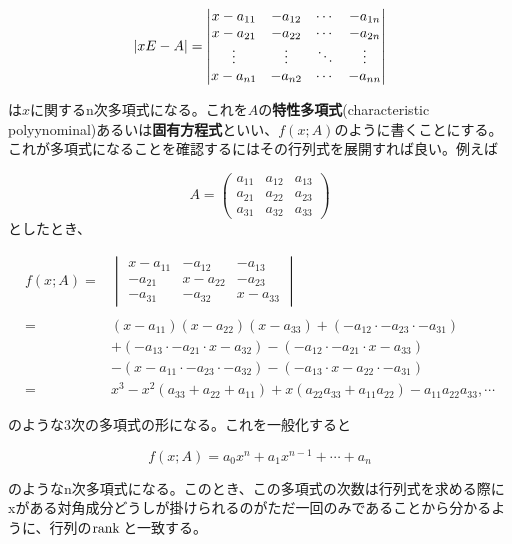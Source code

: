 \documentclass[dvipdfmx,autodetect-engine]{jsarticle}
\theoremstyle{definition}
\newcommand{\rank}[1]{{\rm rank}\,#1}
\DeclarePairedDelimiter{\abs}{\lvert}{\rvert}
\begin{document}
$$
\abs{xE - A} = \begin{vmatrix}
x - a_{11} & -a_{12} & \cdots & - a_{1n} \\
x - a_{21} & -a_{22} & \cdots & - a_{2n} \\
\vdots     & \vdots  & \ddots & \vdots \\
x - a_{n1} & -a_{n2} & \cdots & - a_{nn}
\end{vmatrix}
$$

は$x$に関するn次多項式になる。これを$A$の{\bf 特性多項式}(characteristic polyynominal)あるいは{\bf 固有方程式}といい、$f(x;A)$のように書くことにする。これが多項式になることを確認するにはその行列式を展開すれば良い。例えば

$$
A = \begin{pmatrix}
a_{11} & a_{12} & a_{13} \\ 
a_{21} & a_{22} & a_{23} \\ 
a_{31} & a_{32} & a_{33}
\end{pmatrix}
$$としたとき、

\begin{equation}
\begin{split}
    f(x;A) 
    ={}&
    \begin{vmatrix}
    x - a_{11} & - a_{12} & -a_{13} \\ 
    -a_{21} & x - a_{22} & -a_{23} \\ 
    -a_{31} & -a_{32} & x - a_{33}
    \end{vmatrix} \\
    \\={}&
    (x - a_{11})(x - a_{22})(x - a_{33}) + (-a_{12} \cdot -a_{23} \cdot -a_{31})
    \\&+
    (-a_{13} \cdot -a_{21} \cdot x - a_{32}) - (-a_{12} \cdot -a_{21} \cdot x - a_{33})
    \\&-(x - a_{11} \cdot  -a_{23} \cdot -a_{32}) - (- a_{13} \cdot x - a_{22} \cdot - a_{31})
    \\={}&x^3 - x^2(a_{33} + a_{22} + a_{11}) + x(a_{22}a_{33} + a_{11}a_{22}) - a_{11}a_{22}a_{33}, \cdots
\end{split}
\end{equation}

のような3次の多項式の形になる。これを一般化すると

$$
f(x;A) = a_0x^n + a_1x^{n-1} + \cdots + a_n
$$

のようなn次多項式になる。このとき、この多項式の次数は行列式を求める際にxがある対角成分どうしが掛けられるのがただ一回のみであることから分かるように、行列の$\rank$と一致する。
\end{document}
